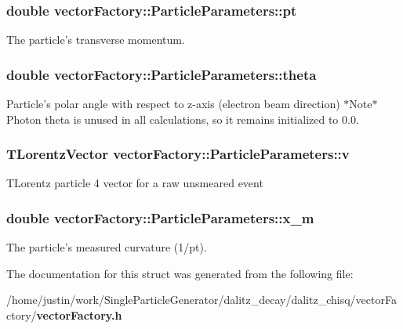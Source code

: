 \subsubsection{\setlength{\rightskip}{0pt plus 5cm}double \bf{vector\-Factory::Particle\-Parameters::pt}}\label{structvectorFactory_1_1ParticleParameters_f7fd158513cf6690d9d6672a4af60022}


The particle's transverse momentum. 
\subsubsection{\setlength{\rightskip}{0pt plus 5cm}double \bf{vector\-Factory::Particle\-Parameters::theta}}\label{structvectorFactory_1_1ParticleParameters_15a254897236c9cbbf07c1f468304104}


Particle's polar angle with respect to z-axis (electron beam direction) $\ast$Note$\ast$ Photon theta is unused in all calculations, so it remains initialized to 0.0. 
\subsubsection{\setlength{\rightskip}{0pt plus 5cm}TLorentz\-Vector \bf{vector\-Factory::Particle\-Parameters::v}}\label{structvectorFactory_1_1ParticleParameters_5fca86d6e11698757a26dc696ab15361}


TLorentz particle 4 vector for a raw unsmeared event 
\subsubsection{\setlength{\rightskip}{0pt plus 5cm}double \bf{vector\-Factory::Particle\-Parameters::x\_\-m}}\label{structvectorFactory_1_1ParticleParameters_fdac11560cb82caeb2e89b5758db3cee}


The particle's measured curvature (1/pt). 

The documentation for this struct was generated from the following file:\begin{CompactItemize}
\item 
/home/justin/work/Single\-Particle\-Generator/dalitz\_\-decay/dalitz\_\-chisq/vector\-Factory/\bf{vector\-Factory.h}\end{CompactItemize}
